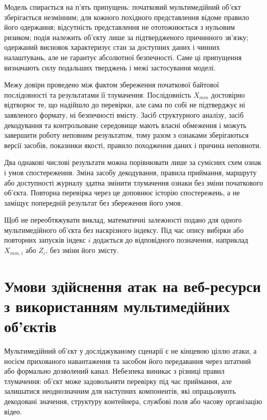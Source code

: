 Модель спирається на п’ять припущень: початковий мультимедійний об’єкт зберігається незмінним; для кожного похідного представлення відоме правило його одержання; відсутність представлення не ототожнюється з нульовим ризиком; подія належить об’єкту лише за підтвердженого причинного зв’язку; одержаний висновок характеризує стан за доступних даних і чинних налаштувань, але не гарантує абсолютної безпечності. Саме ці припущення визначають силу подальших тверджень і межі застосування моделі.

Межу довіри проведено між фактом збереження початкової байтової послідовності та результатами її тлумачення. Послідовність $X_{mm}$ достовірно відтворює те, що надійшло до перевірки, але сама по собі не підтверджує ні заявленого формату, ні безпечності вмісту. Засіб структурного аналізу, засіб декодування та контрольоване середовище мають власні обмеження і можуть завершити роботу неповним результатом, тому разом з ознаками зберігаються версії засобів, показники якості, правило походження даних і причина неповноти.

Два однакові числові результати можна порівнювати лише за сумісних схем ознак і умов спостереження. Зміна засобу декодування, правила приймання, маршруту або доступності журналу здатна змінити тлумачення ознаки без зміни початкового об’єкта. Повторна перевірка через це доповнює історію спостережень, а не заміщує попередній результат без збереження його умов.

Щоб не переобтяжувати виклад, математичні залежності подано для одного мультимедійного об’єкта без наскрізного індексу. Під час опису вибірки або повторних запусків індекс $i$ додається до відповідного позначення, наприклад $X_{mm,i}$ або $Z_i$, без зміни його змісту.

\section{Умови здійснення атак на веб-ресурси з використанням мультимедійних об’єктів}
\label{sec:attack_model}

Мультимедійний об’єкт у досліджуваному сценарії є не кінцевою ціллю атаки, а носієм прихованого навантаження та засобом його передавання через штатний або формально дозволений канал. Небезпека виникає з різниці правил тлумачення: об’єкт може задовольняти перевірку під час приймання, але залишатися неоднозначним для наступних компонентів, які опрацьовують декодовані значення, структуру контейнера, службові поля або часову організацію відео.


